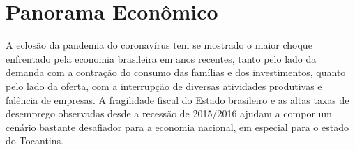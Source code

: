 \chapter{Panorama Econômico}
\par A eclosão da pandemia do coronavírus tem se mostrado o maior choque enfrentado pela economia brasileira em anos recentes, tanto pelo lado da demanda com a contração do consumo das famílias e dos investimentos, quanto pelo lado da oferta, com a interrupção de diversas atividades produtivas e falência de empresas. A fragilidade fiscal do Estado brasileiro e as altas taxas de desemprego observadas desde a recessão de 2015/2016 ajudam a compor um cenário bastante desafiador para a economia nacional, em especial para o estado do Tocantins.
